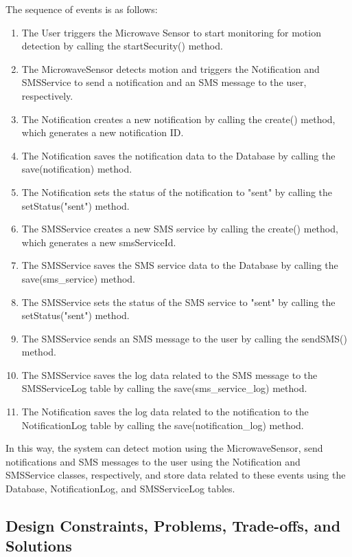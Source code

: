 \documentclass[conference]{IEEEtran}
\begin{document}
The sequence of events is as follows:
\begin{enumerate}
      \item The User triggers the Microwave Sensor to start monitoring for motion detection
            by calling the startSecurity() method.
      \item The MicrowaveSensor detects motion and triggers the Notification and SMSService
            to send a notification and an SMS message to the user, respectively.
      \item The Notification creates a new notification by calling the create() method,
            which generates a new notification ID.
      \item The Notification saves the notification data to the Database by calling the
            save(notification) method.
      \item The Notification sets the status of the notification to "sent" by calling the
            setStatus("sent") method.
      \item The SMSService creates a new SMS service by calling the create() method,
            which generates a new smsServiceId.
      \item The SMSService saves the SMS service data to the Database by calling the
            save(sms\_service) method.
      \item The SMSService sets the status of the SMS service to "sent" by calling the
            setStatus("sent") method.
      \item The SMSService sends an SMS message to the user by calling the sendSMS() method.
      \item The SMSService saves the log data related to the SMS message to the
            SMSServiceLog table by calling the save(sms\_service\_log) method.
      \item The Notification saves the log data related to the notification to the
            NotificationLog table by calling the save(notification\_log) method.
\end{enumerate}

In this way, the system can detect motion using the MicrowaveSensor, send notifications
and SMS messages to the user using the Notification and SMSService classes, respectively,
and store data related to these events using the Database, NotificationLog, and
SMSServiceLog tables.

\subsection{Design Constraints, Problems, Trade-offs, and Solutions}
\end{document}

